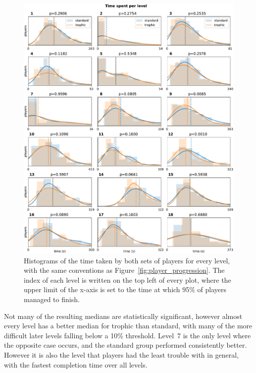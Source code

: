 \begin{figure}
    \centering
    \includegraphics[width=\textwidth]{joy/times.pdf}
    \caption[Histograms showing the time spent on each level]{Histograms of the time taken by both sets of players for every level, with the same conventions as Figure~\ref{fig:player_progression}. The index of each level is written on the top left of every plot, where the upper limit of the x-axis is set to the time at which 95\% of players managed to finish.}
    \label{fig:level_times}
\end{figure}

Not many of the resulting medians are statistically significant, however almost every level has a better median for trophic than standard, with many of the more difficult later levels falling below a 10\% threshold.
Level~7 is the only level where the opposite case occurs, and the standard group performed consistently better. However it is also the level that players had the least trouble with in general, with the fastest completion time over all levels.

